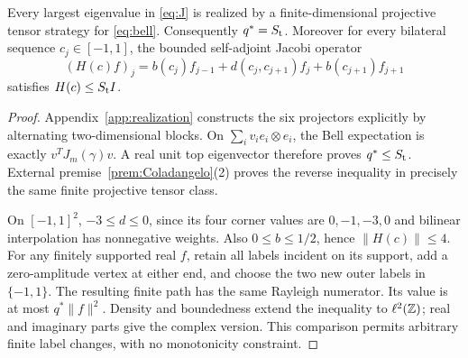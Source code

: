 \begin{proposition}\label{prop:qstar}
Every largest eigenvalue in \eqref{eq:J} is realized by a finite-dimensional
projective tensor strategy for \eqref{eq:bell}. Consequently \(q^*=S_{\mathrm t}\).
Moreover for every bilateral sequence \(c_j\in[-1,1]\), the bounded
self-adjoint Jacobi operator
\begin{equation}\label{eq:H}
 (H(c)f)_j=b(c_j)f_{j-1}+d(c_j,c_{j+1})f_j+b(c_{j+1})f_{j+1}
\end{equation}
satisfies \(H(c)\le S_{\mathrm t} I\).
\end{proposition}
\begin{proof}
Appendix~\ref{app:realization} constructs the six projectors explicitly by
alternating two-dimensional blocks. On
\(\sum_i v_i e_i\otimes e_i\), the Bell expectation is exactly
\(v^TJ_m(\gamma)v\). A real unit top eigenvector therefore proves
\(q^*\le S_{\mathrm t}\). External premise~\ref{prem:Coladangelo}(2) proves the reverse
inequality in precisely the same finite projective tensor class.

On \([-1,1]^2\), \(-3\le d\le0\), since its four corner values are
\(0,-1,-3,0\) and bilinear interpolation has nonnegative weights. Also
\(0\le b\le1/2\), hence \(\|H(c)\|\le4\). For any finitely supported
real \(f\), retain all labels incident on its support, add a zero-amplitude
vertex at either end, and choose the two new outer labels in \(\{-1,1\}\).
The resulting finite path has the same Rayleigh numerator. Its value is at
most \(q^*\|f\|^2\). Density and boundedness extend the inequality to
\(\ell^2(\mathbb Z)\); real and imaginary parts give the complex version. This
comparison permits arbitrary finite label changes, with no monotonicity
constraint.
\end{proof}
